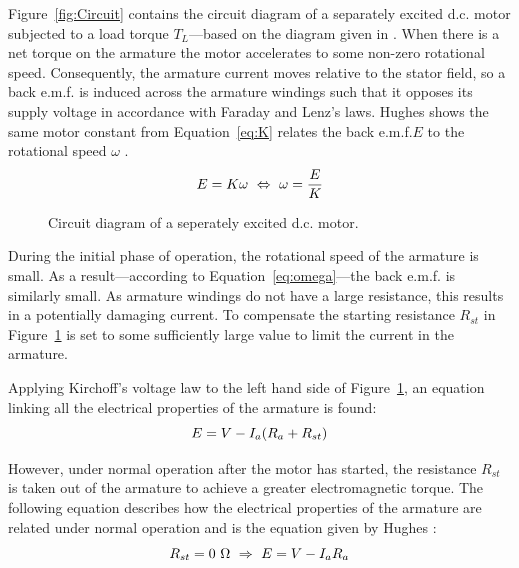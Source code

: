 \documentclass[a4paper,11pt,twocolumn]{article}
\newcommand{\Ohm}{\si{\ohm}\xspace}
\newcommand{\DC}{d.c.\xspace}
\newcommand{\EMF}{e.m.f.\xspace}
\begin{document}
Figure~\vref{fig:Circuit} contains the circuit diagram of a separately excited 
\DC motor subjected to a load torque $T_L$---based on the diagram given in 
\cite{kazemtabrizi2015dc}. When there is a net torque on the armature the motor 
accelerates to some non-zero rotational speed. Consequently, the armature 
current moves relative to the stator field, so a back \EMF is induced across 
the armature windings such that it opposes its supply voltage in accordance 
with Faraday and Lenz's laws. Hughes shows the same motor constant from 
Equation~\ref{eq:K} relates the back \EMF $E$ to the rotational speed $\omega$ 
\cite[p.~873]{hughes2010hughes}.
\begin{equation}  \label{eq:omega}
    E = K \omega ~\Leftrightarrow~ \omega = \frac{E}{K} \\
\end{equation}

\begin{figure}[h]
    \centering
    \def\svgwidth{0.48\textwidth}
    
    \caption{Circuit diagram of a seperately excited \DC motor.}
    \label{fig:Circuit}
\end{figure}

During the initial phase of operation, the rotational speed of the armature is 
small. As a result---according to Equation~\ref{eq:omega}---the back \EMF is 
similarly small. As armature windings do not have a large resistance, this 
results in a potentially damaging current. To compensate the starting 
resistance $R_{st}$ in  Figure~\ref{fig:Circuit} is set to some sufficiently 
large value to limit the current in the armature.

Applying Kirchoff's voltage law to the left hand side of 
Figure~\ref{fig:Circuit}, an equation linking all the electrical properties of 
the armature is found:
\begin{equation}  \label{eq:ERst}
    E = V - I_a(R_a + R_{st}) \\
\end{equation}

However, under normal operation after the motor has started, the resistance 
$R_{st}$ is taken out of the armature to achieve a greater electromagnetic 
torque. The following equation describes how the electrical properties of the 
armature are related under normal operation and is the equation given by Hughes 
\cite[p.~871]{hughes2010hughes}:
\begin{equation}  \label{eq:E}
    R_{st} = 0~\Ohm ~\Rightarrow~ E = V - I_a R_a \\
\end{equation}
\end{document}
